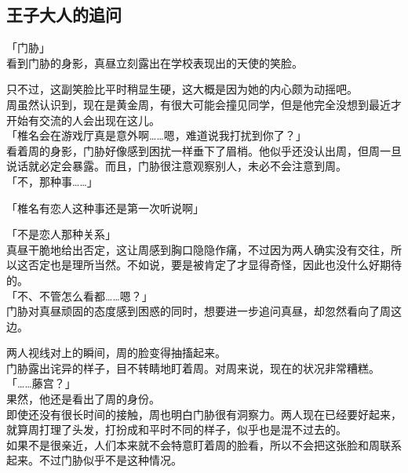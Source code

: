 \subsection{王子大人的追问}

「门胁」\\

看到门胁的身影，真昼立刻露出在学校表现出的天使的笑脸。

只不过，这副笑脸比平时稍显生硬，这大概是因为她的内心颇为动摇吧。\\

周虽然认识到，现在是黄金周，有很大可能会撞见同学，但是他完全没想到最近才开始有交流的人会出现在这儿。\\

「椎名会在游戏厅真是意外啊……嗯，难道说我打扰到你了？」\\

看着周的身影，门胁好像感到困扰一样垂下了眉梢。他似乎还没认出周，但周一旦说话就必定会暴露。而且，门胁很注意观察别人，未必不会注意到周。\\

「不，那种事……」

「椎名有恋人这种事还是第一次听说啊」

「不是恋人那种关系」\\

真昼干脆地给出否定，这让周感到胸口隐隐作痛，不过因为两人确实没有交往，所以这否定也是理所当然。不如说，要是被肯定了才显得奇怪，因此也没什么好期待的。\\

「不、不管怎么看都……嗯？」\\

门胁对真昼顽固的态度感到困惑的同时，想要进一步追问真昼，却忽然看向了周这边。

两人视线对上的瞬间，周的脸变得抽搐起来。\\

门胁露出诧异的样子，目不转睛地盯着周。对周来说，现在的状况非常糟糕。\\

「……藤宫？」\\

果然，他还是看出了周的身份。\\

即使还没有很长时间的接触，周也明白门胁很有洞察力。两人现在已经要好起来，就算周打理了头发，打扮成和平时不同的样子，似乎也是混不过去的。\\

如果不是很亲近，人们本来就不会特意盯着周的脸看，所以不会把这张脸和周联系起来。不过门胁似乎不是这种情况。\\

